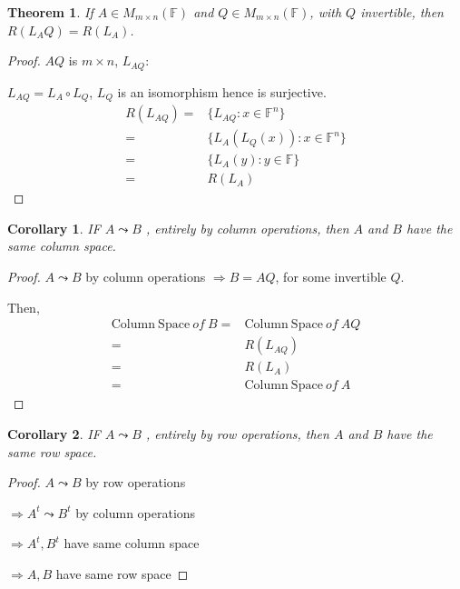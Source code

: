 \documentclass[12pt]{article}
\newtheorem{theorem}{Theorem}[subsection]
\newtheorem{corollary}{Corollary}[subsection]
\newcommand{\ColSpace}{\mathrm{Column \ Space}}
\newcommand{\mF}{{\mathbb{F}}}
\begin{document}
\begin{theorem}
	If $A \in M_{m\times n} (\mF)$ and $Q \in M_{m\times n}(\mF)$, with $Q$
	invertible, then $R(L_AQ) = R(L_A)$. 
\end{theorem}
\begin{proof}
	$AQ$ is $m\times n$, $L_{AQ}:$

	$L_{AQ} = L_A\circ L_Q$, $L_Q$ is an isomorphism hence is surjective. 
	\begin{align*}
		R(L_{AQ}) =& \{L_{AQ}: x\in \mF^n\} \\
		=& \{L_A(L_Q(x)): x\in \mF^n\} \\
		=& \{L_A(y): y\in\mF\} \tag{as $L_Q$ is surjective} \\
		=& R(L_A) 
	 \end{align*}
\end{proof}

\begin{corollary}
	IF $A \leadsto B$ , entirely by column operations, then $A$ and $B$ have 
	the same column space.
\end{corollary}
\begin{proof}
	$A \leadsto B$ by column operations $\Rightarrow B = AQ$, for some 
	invertible $Q$.
	
	Then, 
	\begin{align*}
		\ColSpace \ of \ B 
		=& \ColSpace \ of \ AQ		\\
		=& R(L_{AQ})	\\
		=& R(L_A) \tag{Thm 1}	\\
		=& \ColSpace \ of \ A
	\end{align*}
\end{proof}

\begin{corollary}
	IF $A \leadsto B$ , entirely by row operations, then $A$ and $B$ have 
	the same row space.
\end{corollary}
\begin{proof}
	$A \leadsto B$ by row operations

	$\Rightarrow A^t \leadsto B^t$ by column operations

	$\Rightarrow A^t, B^t$ have same column space

	$\Rightarrow A, B$ have same row space
\end{proof}
\end{document}
